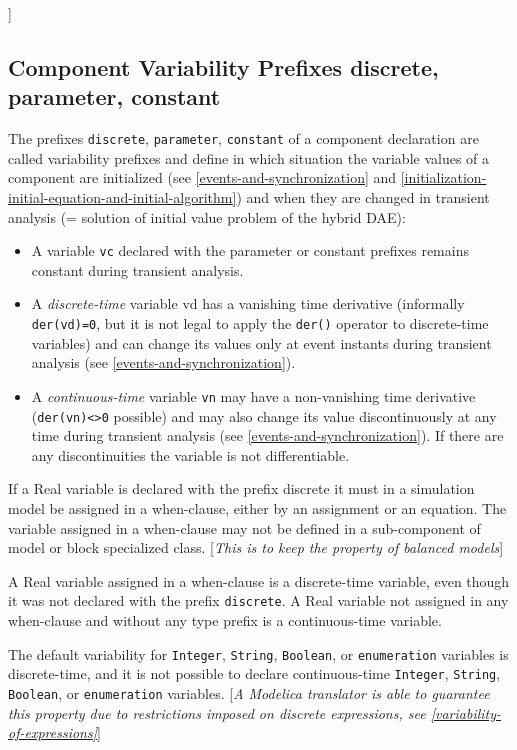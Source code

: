 {]}

\subsection{Component Variability Prefixes discrete, parameter, constant}

The prefixes \lstinline!discrete!, \lstinline!parameter!, \lstinline!constant! of a component declaration
are called variability prefixes and define in which situation the
variable values of a component are initialized (see \autoref{events-and-synchronization} and
\autoref{initialization-initial-equation-and-initial-algorithm}) and when they are changed in transient analysis (= solution
of initial value problem of the hybrid DAE):

\begin{itemize}
\item
  A variable \lstinline!vc! declared with the parameter or constant prefixes remains
  constant during transient analysis.
\item
  A \emph{discrete-time} variable vd has a vanishing time derivative
  (informally \lstinline!der(vd)=0!, but it is not legal to apply the \lstinline!der()! operator
  to discrete-time variables) and can change its values only at event
  instants during transient analysis (see \autoref{events-and-synchronization}).
\item
  A \emph{continuous-time} variable \lstinline!vn! may have a non-vanishing time
  derivative (\lstinline!der(vn)<>0! possible) and may also
  change its value discontinuously at any time during transient analysis
  (see \autoref{events-and-synchronization}). If there are any discontinuities the variable is
  not differentiable.
\end{itemize}

If a Real variable is declared with the prefix discrete it must in a
simulation model be assigned in a when-clause, either by an assignment
or an equation. The variable assigned in a when-clause may not be
defined in a sub-component of model or block specialized class.
{[}\emph{This is to keep the property of balanced models}{]}

A Real variable assigned in a when-clause is a discrete-time variable,
even though it was not declared with the prefix \lstinline!discrete!. A Real
variable not assigned in any when-clause and without any type prefix is
a continuous-time variable.

The default variability for \lstinline!Integer!, \lstinline!String!, 
\lstinline!Boolean!, or \lstinline!enumeration!
variables is discrete-time, and it is not possible to declare
continuous-time \lstinline!Integer!, \lstinline!String!, \lstinline!Boolean!, or 
\lstinline!enumeration! variables.
{[}\emph{A Modelica translator is able to guarantee this property due to
restrictions imposed on discrete expressions, see \autoref{variability-of-expressions}}{]}

